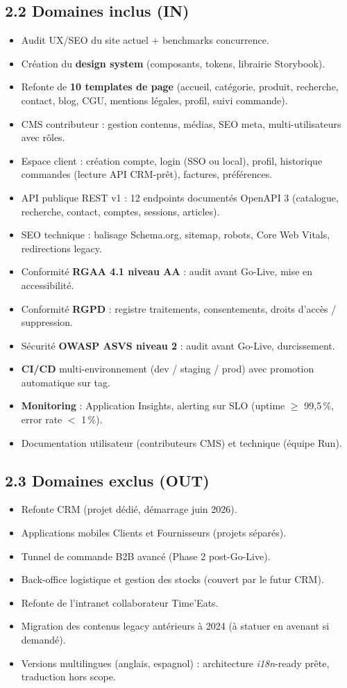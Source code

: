\documentclass[11pt,a4paper,oneside]{report}
\begin{document}
\subsection*{2.2 Domaines inclus (IN)}
\begin{itemize}
  \item Audit UX/SEO du site actuel + benchmarks concurrence.
  \item Création du \textbf{design system} (composants, tokens, librairie Storybook).
  \item Refonte de \textbf{10 templates de page} (accueil, catégorie, produit, recherche, contact, blog, CGU, mentions légales, profil, suivi commande).
  \item CMS contributeur : gestion contenus, médias, SEO meta, multi-utilisateurs avec rôles.
  \item Espace client : création compte, login (SSO ou local), profil, historique commandes (lecture API CRM-prêt), factures, préférences.
  \item API publique REST v1 : 12 endpoints documentés OpenAPI 3 (catalogue, recherche, contact, comptes, sessions, articles).
  \item SEO technique : balisage Schema.org, sitemap, robots, Core Web Vitals, redirections legacy.
  \item Conformité \textbf{RGAA 4.1 niveau AA} : audit avant Go-Live, mise en accessibilité.
  \item Conformité \textbf{RGPD} : registre traitements, consentements, droits d'accès / suppression.
  \item Sécurité \textbf{OWASP ASVS niveau 2} : audit avant Go-Live, durcissement.
  \item \textbf{CI/CD} multi-environnement (dev / staging / prod) avec promotion automatique sur tag.
  \item \textbf{Monitoring} : Application Insights, alerting sur SLO (uptime $\geq$ 99{,}5\,\%, error rate $<$ 1\,\%).
  \item Documentation utilisateur (contributeurs CMS) et technique (équipe Run).
\end{itemize}

\subsection*{2.3 Domaines exclus (OUT)}
\begin{itemize}
  \item Refonte CRM (projet dédié, démarrage juin 2026).
  \item Applications mobiles Clients et Fournisseurs (projets séparés).
  \item Tunnel de commande B2B avancé (Phase 2 post-Go-Live).
  \item Back-office logistique et gestion des stocks (couvert par le futur CRM).
  \item Refonte de l'intranet collaborateur Time'Eats.
  \item Migration des contenus legacy antérieurs à 2024 (à statuer en avenant si demandé).
  \item Versions multilingues (anglais, espagnol) : architecture \emph{i18n}-ready prête, traduction hors scope.
\end{itemize}
\end{document}
